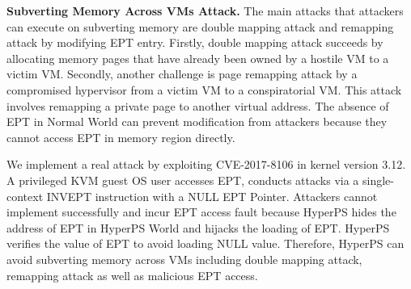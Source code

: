 \documentclass[10pt, numbers, preprint ]{sigplanconf}
\begin{document}
{%
\begin{table}[htbp]
	\centering
	\caption{Page-Mark Table.}
	\label{tb3_pagemark_instance}
\end{table}

\textbf{Subverting Memory Across VMs Attack.} The main attacks that attackers can execute on subverting memory are double mapping attack and remapping attack by modifying EPT entry. Firstly, double mapping attack succeeds by allocating memory pages that have already been owned by a hostile VM to a victim VM. Secondly, another challenge is page remapping attack by a compromised hypervisor from a victim VM to a conspiratorial VM. This attack involves remapping a private page to another virtual address. The absence of EPT in Normal World can prevent modification from attackers because they cannot access EPT in memory region directly.

We implement a real attack by exploiting CVE-2017-8106 in kernel version 3.12. A privileged KVM guest OS user accesses EPT, conducts attacks via a single-context INVEPT instruction with a NULL EPT Pointer. Attackers cannot implement successfully and incur EPT access fault because HyperPS hides the address of EPT in HyperPS World and hijacks the loading of EPT. HyperPS verifies the value of EPT to avoid loading NULL value. Therefore, HyperPS can avoid subverting memory across VMs including double mapping attack, remapping attack as well as malicious EPT access.

}
\end{document}
